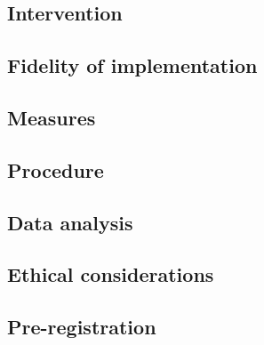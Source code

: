\documentclass[11pt,a4paper]{article}
\begin{document}
\subsection{Intervention}

\subsection{Fidelity of implementation}

\subsection{Measures}

\subsection{Procedure}

\subsection{Data analysis}

\subsection{Ethical considerations}

\subsection{Pre-registration}
\end{document}
